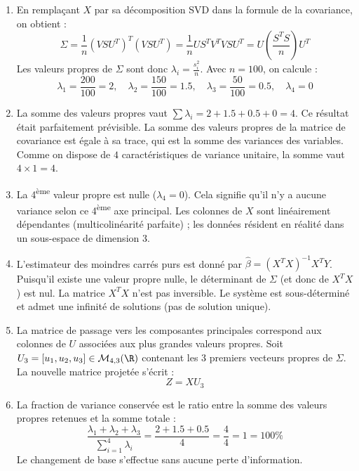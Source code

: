 \documentclass[solutions]{../exercices}
\begin{document}
\begin{solution}
	\begin{enumerate}
		\item En remplaçant $X$ par sa décomposition SVD dans la formule de la covariance, on obtient :
		\[ \Sigma = \frac{1}{n} (V S U^T)^T (V S U^T) = \frac{1}{n} U S^T V^T V S U^T = U \left(\frac{S^T S}{n}\right) U^T \]
		Les valeurs propres de $\Sigma$ sont donc $\lambda_i = \frac{s_i^2}{n}$. 
		Avec $n = 100$, on calcule :
		\[ \lambda_1 = \frac{200}{100} = 2, \quad \lambda_2 = \frac{150}{100} = 1.5, \quad \lambda_3 = \frac{50}{100} = 0.5, \quad \lambda_4 = 0 \]

		\item La somme des valeurs propres vaut $\sum \lambda_i = 2 + 1.5 + 0.5 + 0 = 4$.
		Ce résultat était parfaitement prévisible. La somme des valeurs propres de la matrice de covariance est égale à sa trace, qui est la somme des variances des variables. Comme on dispose de $4$ caractéristiques de variance unitaire, la somme vaut $4 \times 1 = 4$.

		\item La 4\textsuperscript{ème} valeur propre est nulle ($\lambda_4 = 0$). Cela signifie qu'il n'y a aucune variance selon ce 4\textsuperscript{ème} axe principal. Les colonnes de $X$ sont linéairement dépendantes (multicolinéarité parfaite) ; les données résident en réalité dans un sous-espace de dimension 3.

		\item L'estimateur des moindres carrés purs est donné par $\hat{\beta} = (X^T X)^{-1} X^T Y$. Puisqu'il existe une valeur propre nulle, le déterminant de $\Sigma$ (et donc de $X^T X$) est nul. La matrice $X^T X$ n'est pas inversible. Le système est sous-déterminé et admet une infinité de solutions (pas de solution unique).

		\item La matrice de passage vers les composantes principales correspond aux colonnes de $U$ associées aux plus grandes valeurs propres. Soit $U_3 = [u_1, u_2, u_3] \in \mathcal{M}_{4,3}(\R)$ contenant les 3 premiers vecteurs propres de $\Sigma$. La nouvelle matrice projetée s'écrit :
		\[ Z = X U_3 \]

		\item La fraction de variance conservée est le ratio entre la somme des valeurs propres retenues et la somme totale :
		\[ \frac{\lambda_1 + \lambda_2 + \lambda_3}{\sum_{i=1}^4 \lambda_i} = \frac{2 + 1.5 + 0.5}{4} = \frac{4}{4} = 1 = 100\% \]
		Le changement de base s'effectue sans aucune perte d'information.


\end{enumerate}
\end{solution}
\end{document}
